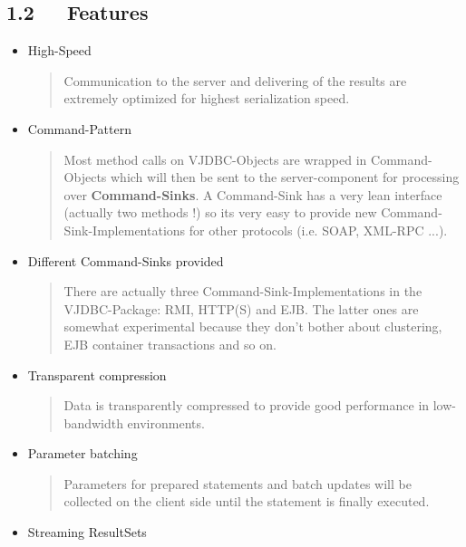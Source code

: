 \documentclass[10pt,a4paper,english]{article}
\begin{document}
\subsection*{1.2~~~Features}
\begin{itemize}
\item {} 
High-Speed
\begin{quote}

Communication to the server and delivering of the results are extremely
optimized for highest serialization speed.
\end{quote}

\item {} 
Command-Pattern
\begin{quote}

Most method calls on VJDBC-Objects are wrapped in Command-Objects which will 
then be sent to the server-component for processing over \textbf{Command-Sinks}. 
A Command-Sink has a very lean interface (actually two methods !) so its very 
easy to provide new Command-Sink-Implementations for other protocols (i.e. 
SOAP, XML-RPC ...).
\end{quote}

\item {} 
Different Command-Sinks provided
\begin{quote}

There are actually three Command-Sink-Implementations in the VJDBC-Package: 
RMI, HTTP(S) and EJB. The latter ones are somewhat experimental because they 
don't bother about clustering, EJB container transactions and so on.
\end{quote}

\item {} 
Transparent compression
\begin{quote}

Data is transparently compressed to provide good performance in low-bandwidth 
environments.
\end{quote}

\item {} 
Parameter batching
\begin{quote}

Parameters for prepared statements and batch updates will be collected on 
the client side until the statement is finally executed.
\end{quote}

\item {} 
Streaming ResultSets
\begin{quote}


\end{quote}
\end{itemize}
\end{document}
